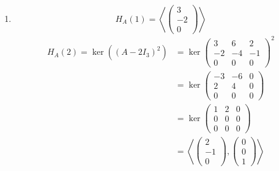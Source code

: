 \documentclass[a4paper,12pt]{article}
\begin{document}
\begin{enumerate}[label=\alph*)]
  \begin{align*}
    \mathrm{Eig}_A(1) = \ker(A - I_3)
    &= \ker\begin{pmatrix} 4 & 6 & 2 \\ -2 & -3 & -1 \\ 0 & 0 & 1 \end{pmatrix} \\
    &= \ker\begin{pmatrix} 2 & 3 & 1 \\ 0 & 0 & 0 \\ 0 & 0 & 1 \end{pmatrix} \\
    &= \ker\begin{pmatrix} 1 & \tfrac{3}{2} & 0 \\ 0 & 0 & 0 \\ 0 & 0 & 1 \end{pmatrix} \\
    &= \left\langle \begin{pmatrix} \tfrac{3}{2} \\ -1 \\ 0 \end{pmatrix} \right\rangle
     = \left\langle \begin{pmatrix} 3 \\ -2 \\ 0 \end{pmatrix} \right\rangle
  \end{align*}

  \item
  \[
    H_A(1) = \left\langle \begin{pmatrix} 3 \\ -2 \\ 0 \end{pmatrix} \right\rangle
  \]
  \begin{align*}
    H_A(2) = \ker\!\left( (A - 2I_3)^2 \right)
    &= \ker\begin{pmatrix} 3 & 6 & 2 \\ -2 & -4 & -1 \\ 0 & 0 & 0 \end{pmatrix}^2 \\
    &= \ker\begin{pmatrix} -3 & -6 & 0 \\ 2 & 4 & 0 \\ 0 & 0 & 0 \end{pmatrix} \\
    &= \ker\begin{pmatrix} 1 & 2 & 0 \\ 0 & 0 & 0 \\ 0 & 0 & 0 \end{pmatrix} \\
    &= \left\langle \begin{pmatrix} 2 \\ -1 \\ 0 \end{pmatrix}, \begin{pmatrix} 0 \\ 0 \\ 1 \end{pmatrix} \right\rangle
  \end{align*}


\end{enumerate}
\end{document}
